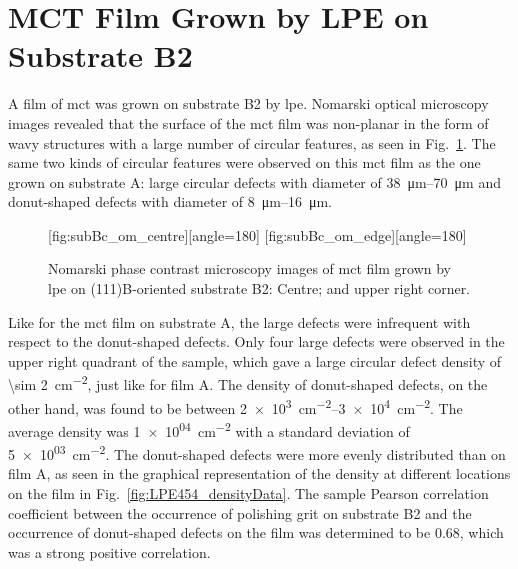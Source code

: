 \clearpage
\section{MCT Film Grown by LPE on Substrate B2}\label{sec:subBc}

A film of \ac{mct} was grown on substrate B2 by \ac{lpe}. Nomarski optical microscopy images revealed that the surface of the \ac{mct} film was non-planar in the form of wavy structures with a large number of circular features, as seen in Fig.~\ref{fig:subBc_om}. The same two kinds of circular features were observed on this \ac{mct} film as the one grown on substrate A: large circular defects with diameter of \SIrange{38}{70}{\micro\metre} and donut-shaped defects with diameter of \SIrange{8}{16}{\micro\metre}.

\begin{figure}[htbp]
    \centering
    [fig:subBc_om_centre][angle=180]
    \hfill
    [fig:subBc_om_edge][angle=180]
    \caption[Nomarski phase contrast microscopy images of \ac{mct} film grown by \ac{lpe} on substrate B2.]{Nomarski phase contrast microscopy images of \ac{mct} film grown by \ac{lpe} on (111)B-oriented substrate B2:  Centre; and  upper right corner.}
    \label{fig:subBc_om}
\end{figure}


Like for the \ac{mct} film on substrate A, the large defects were infrequent with respect to the donut-shaped defects. Only four large defects were observed in the upper right quadrant of the sample, which gave a large circular defect density of \SI{\sim 2}{\centi\metre^{-2}}, just like for film A. The density of donut-shaped defects, on the other hand, was found to be between \SIrange{2e+3}{3e+4}{\centi\metre^{-2}}. The average density was \SI{1e+04}{\centi\metre^{-2}} with a standard deviation of \SI{5e+03}{\centi\metre^{-2}}. The donut-shaped defects were more evenly distributed than on film A, as seen in the graphical representation of the density at different locations on the film in Fig.~\ref{fig:LPE454_densityData}. The sample Pearson correlation coefficient between the occurrence of polishing grit on substrate B2 and the occurrence of donut-shaped defects on the film was determined to be \SI{+0.68}{}, which was a strong positive correlation. 

